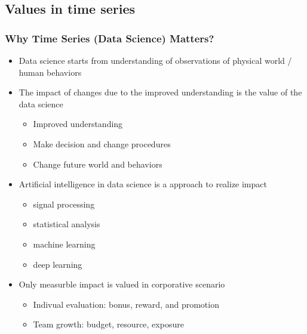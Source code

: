 \documentclass[aspectratio=169,xcolor=x11names,table]{beamer}
\begin{document}

\subsection{Values in time series}
\begin{frame}
	\frametitle{Why Time Series (Data Science) Matters?}
	\large
	\begin{itemize}
		\item<1> Data science starts from understanding of observations of physical world / human behaviors
		\vspace{2mm}
		\item<1> The impact of changes due to the improved understanding is the value of the data science
			\begin{itemize}
				\item Improved understanding 
				\item Make decision and change procedures
				\item Change future world and behaviors
			\end{itemize}
		\vspace{2mm}
		\item<2> Artificial intelligence in data science is a approach to realize impact
				\begin{minipage}{0.48\linewidth}
					\begin{itemize}
						\item signal processing
						\item statistical analysis
					\end{itemize}
				\end{minipage}
				\hfill
				\begin{minipage}{0.5\linewidth}
					\begin{itemize}
						\item machine learning
						\item deep learning
					\end{itemize}
				\end{minipage}
		\vspace{2mm}
		\item<3> Only measurble impact is valued in corporative scenario
			\begin{itemize}
				\item Indivual evaluation: bonus, reward, and promotion
				\item Team growth: budget, resource, exposure
			\end{itemize}
	\end{itemize}
\end{frame}
\end{document}
